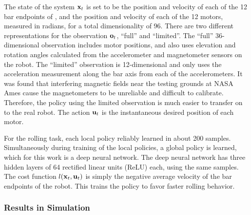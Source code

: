 The state of the system $\mathbf{x}_t$ is set to be the position and velocity of each of the 12 bar endpoints of \SB{}, and the position and velocity of each of the 12 motors, measured in radians, for a total dimensionality of 96. 
There are two different representations for the observation $\mathbf{o}_t$, ``full'' and ``limited''. 
The ``full'' 36-dimensional observation includes motor positions, and also uses elevation and rotation angles calculated from the accelerometer and magnetometer sensors on the robot. 
The ``limited'' observation is 12-dimensional and only uses the acceleration measurement along the bar axis from each of the accelerometers. 
It was found that interfering magnetic fields near the testing grounds at NASA Ames cause the magnetometers to be unreliable and difficult to calibrate.
Therefore, the policy using the limited observation is much easier to transfer on to the real robot. 
The action $\mathbf{u}_t$ is the instantaneous desired position of each motor. 

For the rolling task, each local policy reliably learned in about 200 samples. 
Simultaneously during training of the local policies, a global policy is learned, which for this work is a deep neural network.
The deep neural network has three hidden layers of 64 rectified linear units (ReLU) each, using the same samples.
The cost function $l(\mathbf{x}_t,\mathbf{u}_t)$ is simply the negative average velocity of the bar endpoints of the robot.
This trains the policy to favor faster rolling behavior.

\subsubsection{Results in Simulation}
\label{sec:simresults}

